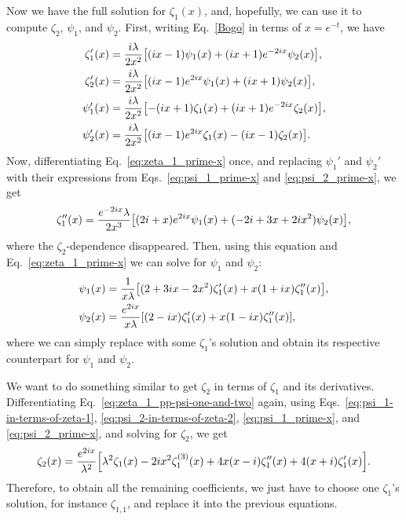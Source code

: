 \documentclass[
 aip,
 jmp,
 amsmath,amssymb,
 reprint,
 nofootinbib,
]{revtex4-2}
\begin{document}
Now we have the full solution for $\zeta_1(x)$, and, hopefully, we can use it to compute $\zeta_2$, $\psi_1$, and $\psi_2$. First, writing Eq.~\eqref{Bogo} in terms of $x = e^{-t}$, we have
\begin{align}
    \zeta_1'(x) & = \frac{i \lambda}{2 x^2} \qty[(i x - 1) \psi_1(x) + (i x + 1) e^{- 2 i x} \psi_2(x)], \label{eq:zeta_1_prime-x}\\
    \zeta_2'(x) & = \frac{i \lambda}{2 x^2} \qty[(i x - 1) e^{2 i x} \psi_1(x) + (ix + 1) \psi_2(x)], \label{eq:zeta_2_prime-x}\\
    \psi_1'(x) & = \frac{i \lambda}{2 x^2} \qty[- (i x + 1) \zeta_1(x) + (i x + 1) e^{- 2 i x} \zeta_2(x)], \label{eq:psi_1_prime-x}\\
    \psi_2'(x) & = \frac{i \lambda}{2 x^2} \qty[(i x - 1) e^{2 i x} \zeta_1(x) - (i x - 1) \zeta_2(x)] \label{eq:psi_2_prime-x}.
\end{align}
Now, differentiating Eq.~\eqref{eq:zeta_1_prime-x} once, and replacing $\psi_1'$ and $\psi_2'$ with their expressions from Eqs.~\eqref{eq:psi_1_prime-x} and \eqref{eq:psi_2_prime-x}, we get
\begin{equation}
    \zeta_1''(x) = \frac{e^{- 2 i x} \lambda}{2 x^3} \qty[(2 i + x) e^{2 i x} \psi_1(x) + (- 2 i + 3 x + 2 i x^2) \psi_2(x)],%
    \label{eq:zeta_1_pp-psi-one-and-two}
\end{equation}
where the $\zeta_2$-dependence disappeared. Then, using this equation and Eq.~\eqref{eq:zeta_1_prime-x} we can solve for $\psi_1$ and $\psi_2$:
\begin{align}
    \psi_1(x) & = \frac{1}{x \lambda} \qty[(2 + 3 i x - 2 x^2) \zeta_1'(x) + x (1 + i x) \zeta_1''(x)], \label{eq:psi_1-in-terms-of-zeta-1}\\
    \psi_2(x) & = \frac{e^{2 i x}}{x \lambda} \qty[(2 - i x) \zeta_1'(x) + x (1 - i x) \zeta_1''(x)] \label{eq:psi_2-in-terms-of-zeta-2},
\end{align}
where we can simply replace with some $\zeta_1$'s solution and obtain its respective counterpart for $\psi_1$ and $\psi_2$.

We want to do something similar to get $\zeta_2$ in terms of $\zeta_1$ and its derivatives. Differentiating Eq.~\eqref{eq:zeta_1_pp-psi-one-and-two} again, using Eqs.~\eqref{eq:psi_1-in-terms-of-zeta-1}, \eqref{eq:psi_2-in-terms-of-zeta-2}, \eqref{eq:psi_1_prime-x}, and \eqref{eq:psi_2_prime-x}, and solving for $\zeta_2$, we get
\begin{equation}
    \zeta_2(x) = \frac{e^{2 i x}}{\lambda^2} \qty[\lambda^2 \zeta_1(x) - 2 i x^2 \zeta_1^{(3)}(x) + 4 x (x - i) \zeta_1''(x) + 4 (x + i) \zeta_1'(x)]. %
    \label{eq:zeta_2-in-terms-of-zeta_1}
\end{equation}
Therefore, to obtain all the remaining coefficients, we just have to choose one $\zeta_1$'s solution, for instance $\zeta_{1,1}$, and replace it into the previous equations.
\end{document}
